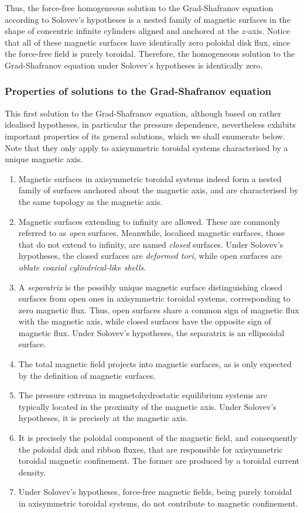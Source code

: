 \quad Thus, the force-free homogeneous solution to the Grad-Shafranov equation according to Solovev's hypotheses is a nested family of magnetic surfaces in the shape of concentric infinite cylinders aligned and anchored at the $z$-axis. Notice that all of these magnetic surfaces have identically zero poloidal disk flux, since the force-free field is purely toroidal. Therefore, the homogeneous solution to the Grad-Shafranov equation under Solovev's hypotheses is identically zero.

\subsubsection{Properties of solutions to the Grad-Shafranov equation}

This first solution to the Grad-Shafranov equation, although based on rather idealised hypotheses, in particular the pressure dependence, nevertheless exhibits important properties of its general solutions, which we shall enumerate below. Note that they only apply to axisymmetric toroidal systems characterised by a unique magnetic axis.

\begin{enumerate}
    \item Magnetic surfaces in axisymmetric toroidal systems indeed form a nested family of surfaces anchored about the magnetic axis, and are characterised by the same topology as the magnetic axis.
    \item Magnetic surfaces extending to infinity are allowed. These are commonly referred to as \textit{open} surfaces. Meanwhile, localised magnetic surfaces, those that do not extend to infinity, are named \textit{closed} surfaces. Under Solovev's hypotheses, the closed surfaces are \textit{deformed tori}, while open surfaces are \textit{oblate coaxial cylindrical-like shells}.
    \item A \textit{separatrix} is the possibly unique magnetic surface distinguishing closed surfaces from open ones in axisymmetric toroidal systems, corresponding to zero magnetic flux. Thus, open surfaces share a common sign of magnetic flux with the magnetic axis, while closed surfaces have the opposite sign of magnetic flux. Under Solovev's hypotheses, the separatrix is an ellipsoidal surface.
    \item The total magnetic field projects into magnetic surfaces, as is only expected by the definition of magnetic surfaces.
    \item The pressure extrema in magnetohydrostatic equilibrium systems are typically located in the proximity of the magnetic axis. Under Solovev's hypotheses, it is precisely at the magnetic axis.
    \item It is precisely the poloidal component of the magnetic field, and consequently the poloidal disk and ribbon fluxes, that are responsible for axisymmetric toroidal magnetic confinement. The former are produced by a toroidal current density.
    \item Under Solovev's hypotheses, force-free magnetic fields, being purely toroidal in axisymmetric toroidal systems, do not contribute to magnetic confinement.
\end{enumerate}

